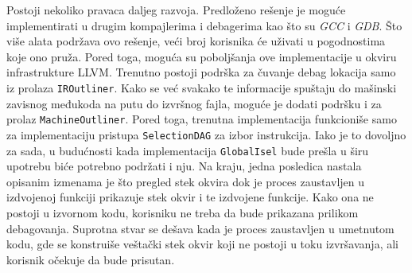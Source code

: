 \documentclass[12pt,oneside]{memoir}
\begin{document}
Postoji nekoliko pravaca daljeg razvoja.
Predloženo rešenje je moguće implementirati u drugim kompajlerima i debagerima kao što su \textit{GCC} i \textit{GDB}.
Što više alata podržava ovo rešenje, veći broj korisnika će uživati u pogodnostima koje ono pruža.
Pored toga, moguća su poboljšanja ove implementacije u okviru infrastrukture LLVM.
Trenutno postoji podrška za čuvanje debag lokacija samo iz prolaza \verb|IROutliner|.
Kako se već svakako te informacije spuštaju do mašinski zavisnog međukoda na putu do izvršnog fajla, moguće je dodati podršku i za prolaz \verb|MachineOutliner|.
Pored toga, trenutna implementacija funkcioniše samo za implementaciju pristupa \verb|SelectionDAG| za izbor instrukcija.
Iako je to dovoljno za sada, u budućnosti kada implementacija \verb|GlobalIsel| bude prešla u širu upotrebu biće potrebno podržati i nju.
Na kraju, jedna posledica nastala opisanim izmenama je što pregled stek okvira dok je proces zaustavljen u izdvojenoj funkciji prikazuje stek okvir i te izdvojene funkcije.
Kako ona ne postoji u izvornom kodu, korisniku ne treba da bude prikazana prilikom debagovanja.
Suprotna stvar se dešava kada je proces zaustavljen u umetnutom kodu, gde se konstruiše veštački stek okvir koji ne postoji u toku izvršavanja, ali korisnik očekuje da bude prisutan.

\literatura

\backmatter
\end{document}

